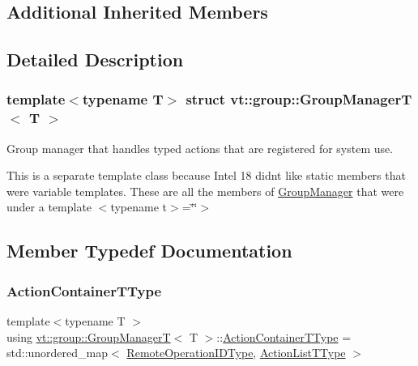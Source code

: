 \subsection*{Additional Inherited Members}


\subsection{Detailed Description}
\subsubsection*{template$<$typename T$>$\newline
struct vt\+::group\+::\+Group\+Manager\+T$<$ T $>$}

Group manager that handles typed actions that are registered for system use. 

This is a separate template class because Intel 18 didn\textquotesingle{}t like static members that were variable templates. These are all the members of \hyperlink{structvt_1_1group_1_1_group_manager}{Group\+Manager} that were under a template $<$typename t$>$=\char`\"{}\char`\"{}$>$ 

\subsection{Member Typedef Documentation}
\mbox{\label{structvt_1_1group_1_1_group_manager_t_adc0d6d680c4f8bdbb80cd90f84a5f7ee}} 
\subsubsection{\texorpdfstring{Action\+Container\+T\+Type}{ActionContainerTType}}
{\footnotesize\ttfamily template$<$typename T $>$ \\
using \hyperlink{structvt_1_1group_1_1_group_manager_t}{vt\+::group\+::\+Group\+ManagerT}$<$ T $>$\+::\hyperlink{structvt_1_1group_1_1_group_manager_t_adc0d6d680c4f8bdbb80cd90f84a5f7ee}{Action\+Container\+T\+Type} =  std\+::unordered\+\_\+map$<$ \hyperlink{namespacevt_1_1group_a73f2624ddeb535b39a08b6524f26b244}{Remote\+Operation\+I\+D\+Type}, \hyperlink{structvt_1_1group_1_1_group_manager_t_a653158254f8de50d4070f0621644a48a}{Action\+List\+T\+Type} $>$}

